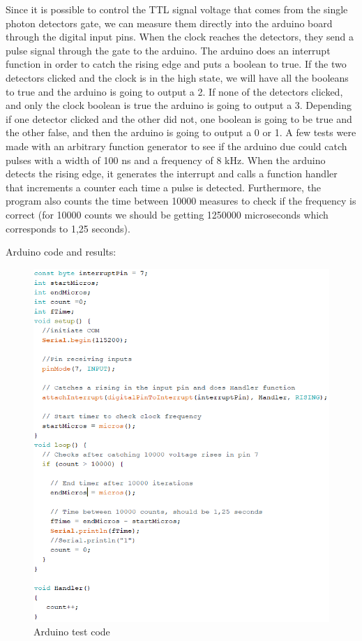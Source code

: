 \begin{refsection}
Since it is possible to control the TTL signal voltage that comes from the single photon detectors gate, we can measure them directly into the arduino board through the digital input pins. When the clock reaches the detectors, they send a pulse signal through the gate to the arduino. The arduino does an interrupt function in order to catch the rising edge and puts a boolean to true. If the two detectors clicked and the clock is in the high state, we will have all the booleans to true and the arduino is going to output a 2. If none of the detectors clicked, and only the clock boolean is true the arduino is going to output a 3. Depending if one detector clicked and the other did not, one boolean is going to be true and the other false, and then the arduino is going to output a 0 or 1.
A few tests were made with an arbitrary function generator to see if the arduino due could catch pulses with a width of 100 ns and a frequency of 8 kHz. When the arduino detects the rising edge, it generates the interrupt and calls a function handler that increments a counter each time a pulse is detected. Furthermore, the program also counts the time between 10000 measures to check if the frequency is correct (for 10000 counts we should be getting 1250000 microseconds which corresponds to 1,25 seconds). 

\clearpage

Arduino code and results:

\begin{figure}[H]
	\centering
	\includegraphics[width=0.85\linewidth]{./sdf/arduino_quantum_rx/figures/arduinoTest.PNG}
	\caption{Arduino test code}
	\label{montage}
\end{figure}


\end{refsection}

